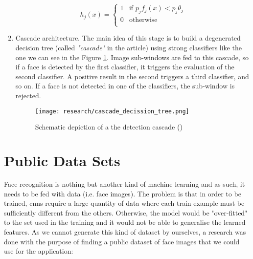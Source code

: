\begin{enumerate}
		\begin{equation}
			\label{eq:viola_jones_weak_classifier}
			h_j(x)=
				\begin{cases}
			     	1 & \text{if $p_jf_j(x) < p_j\theta_j$} \\
			        0 & \text{otherwise} \\
				\end{cases}
		\end{equation}

		\item Cascade architecture. The main idea of this stage is to build a degenerated decision tree (called \textit{"cascade"} in the article) using strong classifiers like the one we can see in the Figure \ref{fig:cascade_decission_tree}. Image sub-windows are fed to this cascade, so if a face is detected by the first classifier, it triggers the evaluation of the second classifier. A positive result in the second triggers a third classifier, and so on. If a face is not detected in one of the classifiers, the sub-window is rejected. 
		
		\begin{figure}[!ht]
			\centering
			\texttt{[image: research/cascade\_decission\_tree.png]}
			\caption{Schematic depiction of a the detection cascade (\cite{viola2001rapid})}
			\label{fig:cascade_decission_tree}
		\end{figure}
			
	\end{enumerate}


                                                                      

\section{Public Data Sets} 
Face recognition is nothing but another kind of machine learning and as such, it needs to be fed with data (i.e. face images). The problem is that in order to be trained, \glspl{cnn} require a large quantity of data where each train example must be sufficiently different from the others. Otherwise, the model would be "over-fitted" to the set used in the training and it would not be able to generalise the learned features. As we cannot generate this kind of dataset by ourselves, a research was done with the purpose of finding a public dataset of face images that we could use for the application:

